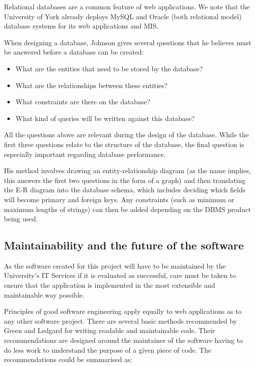 \documentclass[]{scrartcl}
\begin{document}
Relational databases are a common feature of web applications. We note
that the University of York already deploys MySQL and Oracle (both relational
model) database systems for its web applications and MIS.

When designing a database, Johnson \cite{DatabaseModelsLanguagesDesign} gives
several questions that he believes must be answered before a database can be
created:

\begin{itemize}
  \item What are the entities that need to be stored by the database?
  \item What are the relationships between these entities?
  \item What constraints are there on the database?
  \item What kind of queries will be written against this database?
\end{itemize}

All the questions above are relevant during the design of the database. While
the first three questions relate to the structure of the database, the final
question is especially important regarding database performance.

His method involves drawing an entity-relationship diagram (as the name
implies, this answers the first two questions in the form of a graph) and then
translating the E-R diagram into the database schema, which includes deciding
which fields will become primary and foreign keys. Any constraints (such as
minimum or maximum lengths of strings) can then be added depending on the DBMS
product being used.

\subsection{Maintainability and the future of the software}

As the software created for this project will have to be maintained by the
University's IT Services if it is evaluated as successful, care must be taken
to ensure that the application is implemented in the most extensible and
maintainable way possible.

Principles of good software engineering apply equally to web applications as
to any other software project. There are several basic methods recommended by
Green and Ledgard \cite{Green:2011:CGF:2063166.2063168} for writing readable
and maintainable code. Their recommendations are designed around the
maintainer of the software having to do less work to understand the purpose of
a given piece of code. The recommendations could be summarised as:
\end{document}
